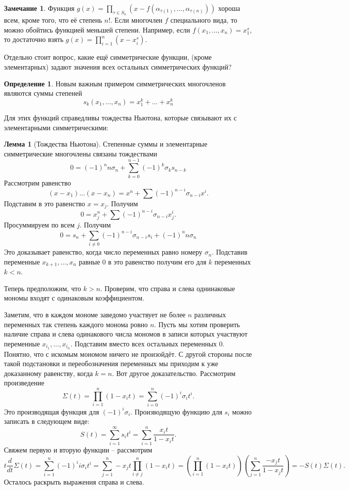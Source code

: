 \documentclass[10pt,a4paper,oneside]{book}
\theoremstyle{definition}
\newtheorem*{rem}{Замечание}
\newtheorem*{defn}{{\color{yellow!30!red} Определение}}
\newtheorem{lem}{{\color{green!50!black} Лемма}}
\def\dfn{\begin{defn}}
\def\edfn{\end{defn}}
\def\lm{\begin{lem}}
\def\elm{\end{lem}}
\begin{document}
\begin{rem}
Функция $g(x)=\prod_{\tau \in S_n} (x - f(\alpha_{\tau(1)}, \dots, \alpha_{\tau(n)}))$ хороша всем, кроме того, что её степень $n!$. Если многочлен $f$ специального вида, то можно обойтись функцией меньшей степени. Например, если $f(x_1, \dots, x_n)=x_1^s$, то достаточно взять $g(x)=\prod_{i=1}^n (x - x_i^s)$.
\end{rem}



Отдельно стоит вопрос, какие ещё симметрические функции, (кроме элементарных) задают значения всех остальных симметрических функций? 

\dfn Новым важным примером симметрических многочленов являются суммы степеней 
$$s_k(x_1, \dots, x_n)=x_1^k+\dots+x_n^k$$
\edfn

Для этих функций справедливы тождества Ньютона, которые связывают их с элементарными симметрическими:

\lm[Тождества Ньютона] Степенные суммы и элементарные симметрические многочлены связаны тождествами
$$0=(-1)^n n\sigma_n + \sum_{k=0}^{n-1}(-1)^k \sigma_k s_{n-k}$$
\proof Рассмотрим равенство $$(x-x_1)\dots(x-x_n)=x^n+\sum (-1)^{n-i}\sigma_{n-i} x^i.$$ 
Подставим в это равенство $x=x_j$. Получим $$0=x_j^n+\sum (-1)^{n-i}\sigma_{n-i} x_j^i.$$
Просуммируем по всем $j$. Получим 
$$0=s_n+\sum_{i\neq 0} (-1)^{n-i}\sigma_{n-i} s_i + (-1)^nn\sigma_n$$
Это доказывает равенство, когда число переменных равно номеру $\sigma_n$. Подставив переменные $x_{k+1},\dots, x_n$ равные 0 в это равенство получим его для $k$ переменных $k<n$. 

Теперь  предположим, что $k>n$. Проверим, что справа и слева однинаковые мономы входят с одинаковым коэффициентом.

Заметим, что в каждом мономе заведомо участвует не более $n$ различных переменных так степень каждого монома ровно $n$. Пусть мы хотим проверить наличие справа и слева одинакового числа мономов в записи которых участвуют  переменные $x_{i_1},\dots, x_{i_n}$. Подставим вместо всех остальных переменных 0. Понятно, что с искомым мономом ничего не произойдёт. С другой стороны после такой подстановки и переобозначения переменных мы приходим к уже доказанному равенству, когда $k=n$.
\endproof
\proof Вот другое доказательство. Рассмотрим произведение
 $$ \Sigma(t)=\prod_{i=1}^n (1-x_it)=\sum_{i=0}^n (-1)^i \sigma_i t^i.$$
Это производящая функция для $(-1)^i\sigma_i$. Производящую функцию для $s_i$ можно записать в следующем виде:
$$S(t)=\sum_{i=1}^{\infty} s_i t^i= \sum_{i=1}^n \frac{x_it}{1-x_it}.$$
Свяжем первую и вторую функции -- рассмотрим 
$$t \frac{d}{dt} \Sigma(t)=\sum_{i=1}^n (-1)^i i\sigma_i t^i = \sum_{j=1}^n -x_jt \prod_{i\neq j}^n (1-x_it)=\left(\prod_{i=1}^n (1-x_it)\right)\left(\sum_{j=1}^n \frac{-x_jt}{1-x_jt}\right)=-S(t) \Sigma(t).$$
Осталось раскрыть выражения справа и слева.
\endproof
\elm
\end{document}
